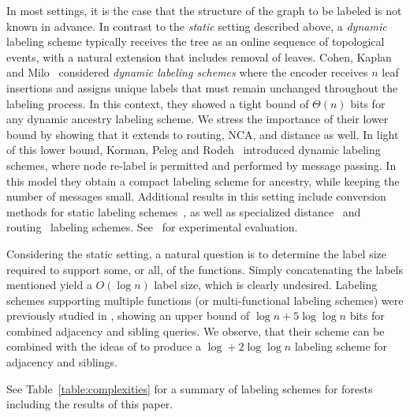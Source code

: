 \documentclass{llncs}
\newcommand{\sd}[1]{{#1}}
\newcommand{\drop}[1]{}
\begin{document}
In most settings, it is the case that the \sd{structure of the graph to be
labeled}\drop{data structure} is not known in advance.
In contrast to the \emph{static} setting described above, a \emph{dynamic}
labeling scheme typically receives the tree as an online sequence of
\sd{topological events}\drop{addition of leaves}, with a natural extension
that includes  removal of
leaves. Cohen, Kaplan and Milo~\cite{cohen2010labeling} considered
\emph{dynamic labeling schemes} where the  encoder receives $n$  leaf
insertions and assigns unique   labels that must remain unchanged throughout
the labeling process. In this context, they showed  a tight bound of
$\Theta(n)$ bits for any dynamic ancestry labeling scheme\drop{\footnote{From
hereon, the lower bound  is referred as Cohen's  bound.}}. We stress the
importance of their lower bound by showing that it extends to  routing, NCA,
and distance as well. In light of this lower bound, Korman, Peleg and
Rodeh~\cite{korman2004labeling} introduced  dynamic labeling schemes, where
node re-label is permitted and performed by message passing. In this model they
obtain a compact labeling scheme for ancestry, while keeping the number of
messages small. Additional results in this setting include conversion methods
for static labeling schemes~\cite{korman2004labeling,korman2007general}, as
well as specialized distance~\cite{korman2007general,korman2007labeling} and
routing~\cite{korman2008improved,korman2009compact} labeling schemes.
See~\cite{Rotbart14} for experimental evaluation.

Considering the static setting, a natural question is to determine the label
size required to support some, or all, of the functions. Simply concatenating
the labels mentioned yield a $O(\log n)$ label size, which is clearly
undesired. Labeling schemes supporting multiple functions (or multi-functional
labeling schemes) were previously studied in \cite{Alstrup05}, showing an upper
bound of $\log n + 5\log\log n$ bits for combined adjacency and sibling
queries. \sd{We observe, that their scheme can be combined with the ideas of
\cite{Alstrup02} to produce a $\log + 2\log\log n$ labeling scheme for
adjacency and siblings.}
\drop{We show that most labeling schemes can be altered to also support
connectivity queries by adding an extra $\log\log n$ bits.
 Thm.~\ref{thm:static-combo-lb} shows that such a labeling scheme requires at
 least $\log n + 2 \log \log n$ bits -- even if it supports just connectivity
 and sibling/ancestry queries.}

See Table~\ref{table:complexities} for a summary of labeling schemes for
forests including the results of this paper.
\end{document}

